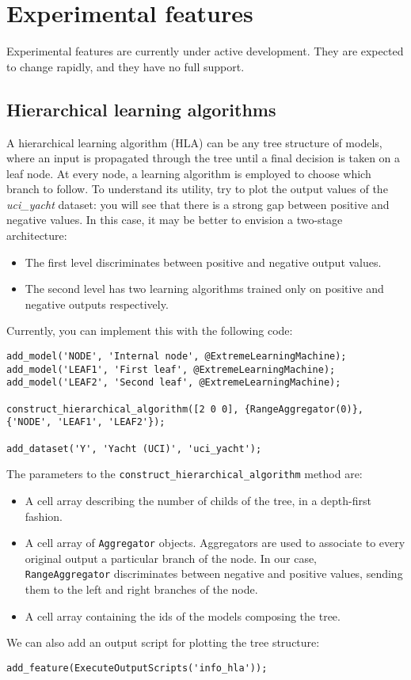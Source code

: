 \chapter{Experimental features}
\label{chap:expfeatures}

Experimental features are currently under active development. They are expected to change rapidly, and they have no full support.

\section{Hierarchical learning algorithms}

A hierarchical learning algorithm (HLA) can be any tree structure of models, where an input is propagated through the tree until a final decision is taken on a leaf node. At every node, a learning algorithm is employed to choose which branch to follow. To understand its utility, try to plot the output values of the \textit{uci\_yacht} dataset: you will see that there is a strong gap between positive and negative values. In this case, it may be better to envision a two-stage architecture:

\begin{itemize}
\item The first level discriminates between positive and negative output values.
\item The second level has two learning algorithms trained only on positive and negative outputs respectively.
\end{itemize}

\noindent Currently, you can implement this with the following code:

\begin{lstlisting}
add_model('NODE', 'Internal node', @ExtremeLearningMachine);
add_model('LEAF1', 'First leaf', @ExtremeLearningMachine);
add_model('LEAF2', 'Second leaf', @ExtremeLearningMachine);

construct_hierarchical_algorithm([2 0 0], {RangeAggregator(0)}, {'NODE', 'LEAF1', 'LEAF2'});

add_dataset('Y', 'Yacht (UCI)', 'uci_yacht');
\end{lstlisting}

\noindent The parameters to the \verb|construct_hierarchical_algorithm| method are:

\begin{itemize}
\item A cell array describing the number of childs of the tree, in a depth-first fashion.
\item A cell array of \verb|Aggregator| objects. Aggregators are used to associate to every original output a particular branch of the node. In our case, \verb|RangeAggregator| discriminates between negative and positive values, sending them to the left and right branches of the node.
\item A cell array containing the ids of the models composing the tree.
\end{itemize}

\noindent We can also add an output script for plotting the tree structure:

\begin{lstlisting}
add_feature(ExecuteOutputScripts('info_hla'));
\end{lstlisting}